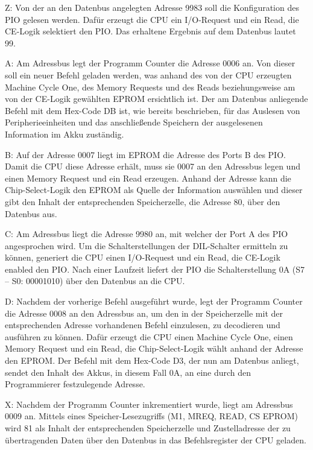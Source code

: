 Z: Von der an den Datenbus angelegten Adresse 9983 soll die Konfiguration des PIO gelesen werden. Dafür erzeugt die CPU ein I/O-Request und ein Read, die CE-Logik selektiert den PIO. Das erhaltene Ergebnis auf dem Datenbus lautet 99.

A: Am Adressbus legt der Programm Counter die Adresse 0006 an. Von dieser soll ein neuer Befehl geladen werden, was anhand des von der CPU erzeugten Machine Cycle One, des Memory Requests und des Reads beziehungsweise am von der CE-Logik gewählten EPROM ersichtlich ist. Der am Datenbus anliegende Befehl mit dem Hex-Code DB ist, wie bereits beschrieben, für das Auslesen von Peripherieeinheiten und das anschließende Speichern der ausgelesenen Information im Akku zuständig.

B: Auf der Adresse 0007 liegt im EPROM die Adresse des Ports B des PIO. Damit die CPU diese Adresse erhält, muss sie 0007 an den Adressbus legen und einen Memory Request und ein Read erzeugen. Anhand der Adresse kann die Chip-Select-Logik den EPROM als Quelle der Information auswählen und dieser gibt den Inhalt der entsprechenden Speicherzelle, die Adresse 80, über den Datenbus aus.

C: Am Adressbus liegt die Adresse 9980 an, mit welcher der Port A des PIO angesprochen wird. Um die Schalterstellungen der DIL-Schalter ermitteln zu können, generiert die CPU einen I/O-Request und ein Read, die CE-Logik enabled den PIO. Nach einer Laufzeit liefert der PIO die Schalterstellung 0A (S7 – S0: 00001010) über den Datenbus an die CPU.

D: Nachdem der vorherige Befehl ausgeführt wurde, legt der Programm Counter die Adresse 0008 an den Adressbus an, um den in der Speicherzelle mit der entsprechenden Adresse vorhandenen Befehl einzulesen, zu decodieren und ausführen zu können. Dafür erzeugt die CPU einen Machine Cycle One, einen Memory Request und ein Read, die Chip-Select-Logik wählt anhand der Adresse den EPROM. Der Befehl mit dem Hex-Code D3, der nun am Datenbus anliegt, sendet den Inhalt des Akkus, in diesem Fall 0A, an eine durch den Programmierer festzulegende Adresse.

X: Nachdem der Programm Counter inkrementiert wurde, liegt am Adressbus 0009 an. Mittels eines Speicher-Lesezugriffs (M1, MREQ, READ, CS EPROM) wird 81 als Inhalt der entsprechenden Speicherzelle und Zustelladresse der zu übertragenden Daten über den Datenbus in das Befehlsregister der CPU geladen.

